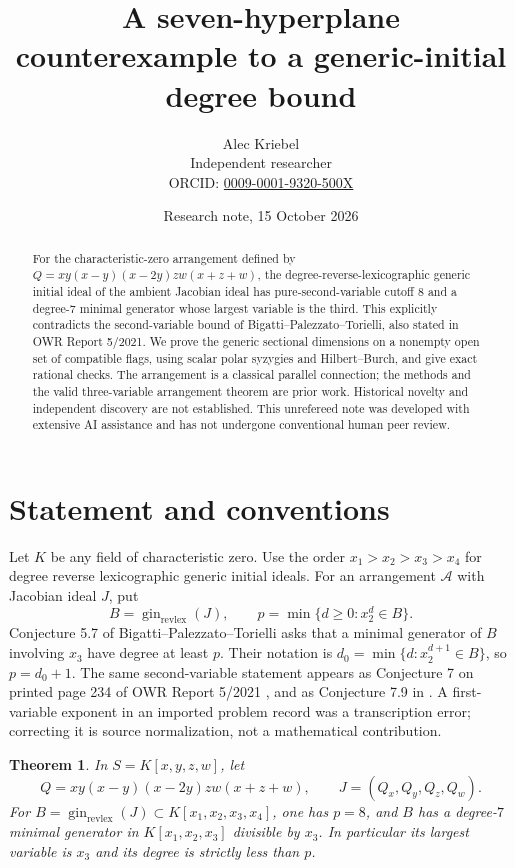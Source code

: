\documentclass[11pt]{article}
\title{A seven-hyperplane counterexample to a generic-initial degree bound}
\author{Alec Kriebel\\
\small Independent researcher\\
\small ORCID: \href{https://orcid.org/0009-0001-9320-500X}{0009-0001-9320-500X}}
\date{Research note, 15 October 2026}
\newtheorem{theorem}{Theorem}
\newcommand{\gin}{\operatorname{gin}_{\mathrm{revlex}}}
\begin{document}
\maketitle
\begin{abstract}
For the characteristic-zero arrangement defined by
$Q=xy(x-y)(x-2y)zw(x+z+w)$, the degree-reverse-lexicographic
generic initial ideal of the ambient Jacobian ideal has pure-second-variable
cutoff $8$ and a degree-$7$ minimal generator whose largest variable is the
third. This explicitly contradicts the second-variable bound of
Bigatti--Palezzato--Torielli, also stated in OWR Report 5/2021.
We prove the generic sectional dimensions on a nonempty open set of compatible
flags, using scalar polar syzygies and Hilbert--Burch, and give exact rational
checks. The arrangement is a classical parallel connection; the methods and
the valid three-variable arrangement theorem are prior work. Historical
novelty and independent discovery are not established. This unrefereed note
was developed with extensive AI assistance and has not undergone conventional
human peer review.
\end{abstract}

\section{Statement and conventions}
Let $K$ be any field of characteristic zero. Use the order
$x_1>x_2>x_3>x_4$ for degree reverse lexicographic generic initial ideals.
For an arrangement $\mathcal A$ with Jacobian ideal $J$, put
\[
 B=\gin(J),\qquad p=\min\{d\geq 0:x_2^d\in B\}.
\]
Conjecture 5.7 of Bigatti--Palezzato--Torielli \cite{BPT} asks that a
minimal generator of $B$ involving $x_3$ have degree at least $p$.
Their notation is $d_0=\min\{d:x_2^{d+1}\in B\}$, so $p=d_0+1$.
The same second-variable statement appears as Conjecture 7 on printed
page 234 of OWR Report 5/2021 \cite{OWR}, and as Conjecture 7.9 in
\cite{PT2020,PT2022}. A first-variable exponent in an imported problem
record was a transcription error; correcting it is source normalization,
not a mathematical contribution.

\begin{theorem}\label{thm:main}
In $S=K[x,y,z,w]$, let
\[
 Q=xy(x-y)(x-2y)zw(x+z+w),\qquad
 J=(Q_x,Q_y,Q_z,Q_w).
\]
For $B=\gin(J)\subset K[x_1,x_2,x_3,x_4]$, one has $p=8$,
and $B$ has a degree-$7$ minimal generator in $K[x_1,x_2,x_3]$
divisible by $x_3$. In particular its largest variable is $x_3$ and its
degree is strictly less than $p$.
\end{theorem}
\end{document}
